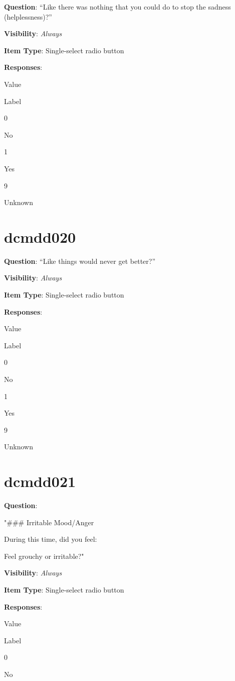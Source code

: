 \documentclass[
]{book}
\begin{document}
\textbf{Question}: ``Like there was nothing that you could do to stop the sadness (helplessness)?''

\textbf{Visibility}: \emph{Always}

\textbf{Item Type}: Single-select radio button

\textbf{Responses}:

Value

Label

0

No

1

Yes

9

Unknown

\hypertarget{dcmdd020}{%
\section{dcmdd020}\label{dcmdd020}}

\textbf{Question}: ``Like things would never get better?''

\textbf{Visibility}: \emph{Always}

\textbf{Item Type}: Single-select radio button

\textbf{Responses}:

Value

Label

0

No

1

Yes

9

Unknown

\hypertarget{dcmdd021}{%
\section{dcmdd021}\label{dcmdd021}}

\textbf{Question}:

"\#\#\# Irritable Mood/Anger

During this time, did you feel:

Feel grouchy or irritable?"

\textbf{Visibility}: \emph{Always}

\textbf{Item Type}: Single-select radio button

\textbf{Responses}:

Value

Label

0

No
\end{document}
